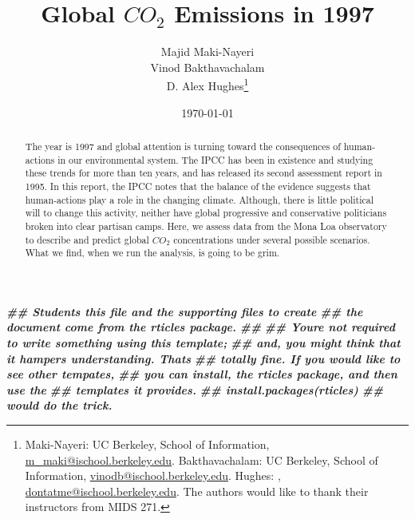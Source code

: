 \documentclass[AER]{AEA}
\newenvironment{Shaded}{\begin{snugshade}}{\end{snugshade}}
\newcommand{\DocumentationTok}[1]{\textcolor[rgb]{0.56,0.35,0.01}{\textbf{\textit{#1}}}}
\begin{document}
\title{Global \(CO_{2}\) Emissions in 1997}


\author{
  Majid Maki-Nayeri\\
  Vinod Bakthavachalam\\
  D. Alex Hughes\thanks{
  Maki-Nayeri: UC Berkeley, School of
Information, \href{mailto:m\_maki@ischool.berkeley.edu}{m\_maki@ischool.berkeley.edu}.
  Bakthavachalam: UC Berkeley, School of
Information, \href{mailto:vinodb@ischool.berkeley.edu}{vinodb@ischool.berkeley.edu}.
  Hughes: , \href{mailto:dontatme@ischool.berkeley.edu}{dontatme@ischool.berkeley.edu}.
  The authors would like to thank their instructors from MIDS 271.
}
}

\date{\today}
\JEL{}

\begin{abstract}
The year is 1997 and global attention is turning toward the consequences
of human-actions in our environmental system. The IPCC has been in
existence and studying these trends for more than ten years, and has
released its second assessment report in 1995. In this report, the IPCC
notes that the balance of the evidence suggests that human-actions play
a role in the changing climate. Although, there is little political will
to change this activity, neither have global progressive and
conservative politicians broken into clear partisan camps. Here, we
assess data from the Mona Loa observatory to describe and predict global
\(CO_{2}\) concentrations under several possible scenarios. What we
find, when we run the analysis, is going to be grim.
\end{abstract}


\maketitle

\begin{Shaded}
\begin{Highlighting}[]
\DocumentationTok{\#\# Students this file and the supporting files to create }
\DocumentationTok{\#\# the document come from the \textasciigrave{}rticles\textasciigrave{} package. }
\DocumentationTok{\#\# }
\DocumentationTok{\#\# You\textquotesingle{}re not required to write something using this template; }
\DocumentationTok{\#\# and, you might think that it hampers understanding. That\textquotesingle{}s }
\DocumentationTok{\#\# totally fine. If you would like to see other tempates, }
\DocumentationTok{\#\# you can install, the \textasciigrave{}rticles\textasciigrave{} package, and then use the}
\DocumentationTok{\#\# templates it provides. }
\DocumentationTok{\#\# install.packages(\textquotesingle{}rticles\textquotesingle{})}
\DocumentationTok{\#\# would do the trick. }
\end{Highlighting}
\end{Shaded}
\end{document}
